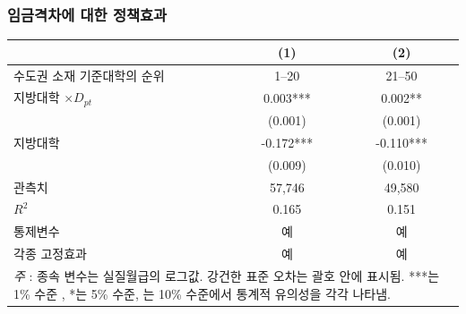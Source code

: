 \documentclass[aspectratio=169,xcolor=dvipsnames,handout]{beamer}
\begin{document}
\begin{frame}
    \frametitle{임금격차에 대한 정책효과}
    \begin{table}[ht]
        \tiny
        \centering
        \begin{tabular}{lcc}
        \toprule
        & \textbf{(1)} & \textbf{(2)} \\
        \midrule
        수도권 소재 기준대학의 순위 & 1--20     & 21--50  \\
        \midrule                                                                                  
        지방대학 $\times D_{pt}$      & 0.003***  & 0.002**   \\
                                                  & (0.001)   & (0.001)   \\
        지방대학                      & -0.172*** & -0.110*** \\
                                                  & (0.009)   & (0.010)   \\
        \midrule                                                          
        관측치                              & 57,746    & 49,580    \\
        $R^2$                                 & 0.165     & 0.151     \\
        통제변수                                  & 예       & 예       \\
        각종 고정효과                                       & 예       & 예       \\
        \bottomrule
        \multicolumn{3}{p{6cm}}{\tiny\textit{주} : 종속 변수는 실질월급의 로그값. 강건한 표준 오차는 괄호 안에 표시됨. ***는 1\% 수준 , *는 5\% 수준, 는 10\% 수준에서 통계적 유의성을 각각 나타냄.} \\
        \end{tabular}
    \end{table}
\end{frame}
\end{document}
